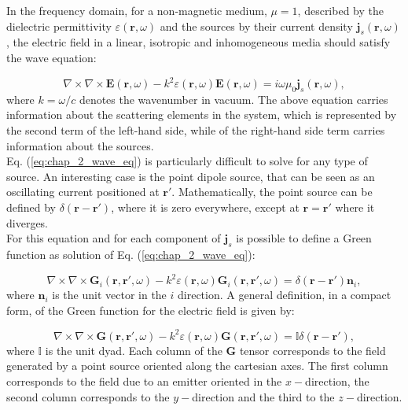 In the frequency domain, for a non-magnetic medium, $\mu=1$, described by the dielectric permittivity $\varepsilon\left(\mathbf{r},\omega\right)$ and the sources by their current density $\mathbf{j}_{s}\left(\mathbf{r},\omega\right)$, the electric field in a linear, isotropic and inhomogeneous media should satisfy the wave equation:

\begin{equation}
\nabla\times\nabla\times\mathbf{E}\left(\mathbf{r},\omega\right) - k^2 \varepsilon\left(\mathbf{r},\omega\right)\mathbf{E}\left(\mathbf{r},\omega\right) = i\omega \mu_{0}\mathbf{j}_{s}\left(\mathbf{r},\omega\right),\label{eq:chap_2_wave_eq}
\end{equation}
where $k=\omega/c$ denotes the wavenumber in vacuum. The above equation carries information about the scattering elements in the system, which is represented by the second term of the left-hand side, while of the right-hand side term carries information about the sources.\\
Eq. (\ref{eq:chap_2_wave_eq}) is particularly difficult to solve for any type of source. An interesting case is the point dipole source, that can be seen as an oscillating current positioned at $\mathbf{r}'$. Mathematically, the point source can be defined by $\delta\left(\mathbf{r}-\mathbf{r}'\right)$, where it is zero everywhere, except at $\mathbf{r} = \mathbf{r}'$ where it diverges.\\
For this equation and for each component of $\mathbf{j}_{s}$ is possible to define a Green function as solution of Eq. (\ref{eq:chap_2_wave_eq}):

\begin{equation}
\nabla\times\nabla\times\mathbf{G}_{i}\left(\mathbf{r},\mathbf{r}',\omega\right) - k^2 \varepsilon\left(\mathbf{r},\omega\right)\mathbf{G}_{i}\left(\mathbf{r},\mathbf{r}',\omega\right) = \delta\left(\mathbf{r}-\mathbf{r}'\right)\mathbf{n}_{i},\label{eq:2}
\end{equation}
where $\mathbf{n}_{i}$ is the unit vector in the $i$ direction.
A general definition, in a compact form, of the Green function for the electric field is given by:

\begin{equation}
\nabla\times\nabla\times\mathbf{G}\left(\mathbf{r},\mathbf{r}',\omega\right) - k^2 \varepsilon\left(\mathbf{r},\omega\right)\mathbf{G}\left(\mathbf{r},\mathbf{r}',\omega\right) = \mathbb{I}\delta\left(\mathbf{r}-\mathbf{r}'\right),\label{eq:chap2_eq3}
\end{equation}
where $\mathbb{I}$ is the unit dyad. Each column of the $\mathbf{G}$ tensor corresponds to the field generated by a point source oriented along the cartesian axes. The first column corresponds to the field due to an emitter oriented in the $x-$direction, the second column corresponds to the $y-$direction and the third to the $z-$direction.

